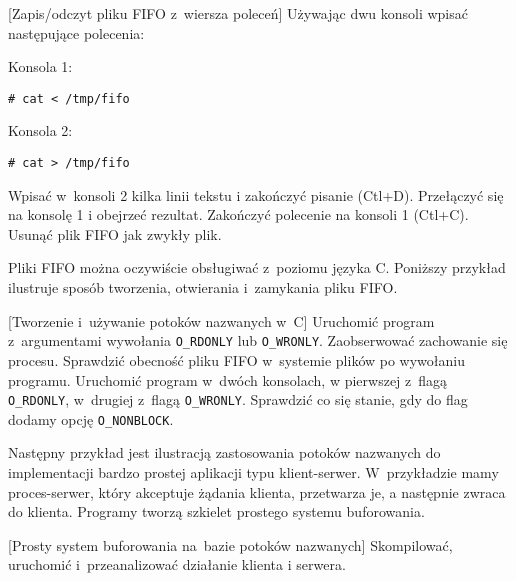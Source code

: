 \begin{example}{[Zapis/odczyt pliku FIFO z~wiersza poleceń]}
Używając dwu konsoli wpisać następujące polecenia:

Konsola 1:
\begin{lstlisting}[style=MyBashStyle]
# cat < /tmp/fifo
\end{lstlisting}

Konsola 2:
\begin{lstlisting}[style=MyBashStyle]
# cat > /tmp/fifo
\end{lstlisting}

Wpisać w~konsoli 2 kilka linii tekstu i zakończyć pisanie (Ctl+D). Przełączyć
się na konsolę 1 i obejrzeć rezultat. Zakończyć polecenie na konsoli 1 (Ctl+C).
Usunąć plik FIFO jak zwykły plik.
\end{example}

Pliki FIFO można oczywiście obsługiwać z~poziomu języka C. Poniższy przykład
ilustruje sposób tworzenia, otwierania i~zamykania pliku FIFO.
\begin{example}{[Tworzenie i~używanie potoków nazwanych w~C]}
  Uruchomić program z~argumentami wywołania \texttt{O\_RDONLY} lub
  \texttt{O\_WRONLY}. Zaobserwować zachowanie się procesu. Sprawdzić obecność
  pliku FIFO w~systemie plików po wywołaniu programu. Uruchomić program w~dwóch
  konsolach, w pierwszej z~flagą \texttt{O\_RDONLY}, w~drugiej z~flagą
  \texttt{O\_WRONLY}. Sprawdzić co się stanie, gdy do flag dodamy opcję
  \texttt{O\_NONBLOCK}.
  
\end{example}

Następny przykład jest ilustracją zastosowania potoków nazwanych do
implementacji bardzo prostej aplikacji typu klient-serwer. W~przykładzie mamy
proces-serwer, który akceptuje żądania klienta, przetwarza je, a następnie
zwraca do klienta. Programy tworzą szkielet prostego systemu buforowania.
\begin{example}{[Prosty system buforowania na~bazie potoków nazwanych]}
  Skompilować, uruchomić i~przeanalizować działanie klienta i serwera.
  
  
\end{example}

